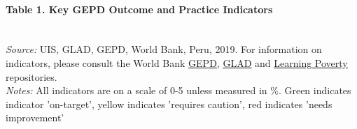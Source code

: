 \documentclass[twocolumn]{article}
\let\oldparagraph\paragraph
\renewcommand{\paragraph}[1]{\oldparagraph{#1}\mbox{}}
\begin{document}
\hypertarget{table-1.-key-gepd-outcome-and-practice-indicators}{%
\paragraph{Table 1. Key GEPD Outcome and Practice
Indicators}\label{table-1.-key-gepd-outcome-and-practice-indicators}}

\begin{table}[H]
\end{table}
\raggedbottom

\begin{table}[H]
\\
\color{darkgray}\scriptsize{\textit{Source:} UIS, GLAD, GEPD, World Bank, Peru, 2019. For information on indicators, please consult the World Bank \href{https://github.com/worldbank/GEPD}{\underline{GEPD}}, \href{https://github.com/worldbank/GLAD}{\underline{GLAD}} and \href{https://github.com/worldbank/LearningPoverty}{\underline{Learning Poverty}} repositories.}\\
\color{darkgray}\scriptsize{\textit{Notes:} All indicators are on a scale of 0-5 unless measured in \%. Green indicates indicator 'on-target', yellow indicates 'requires caution', red indicates 'needs improvement'}
\end{table}
\raggedbottom
\end{document}
